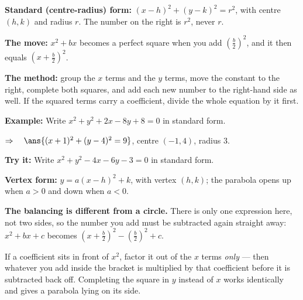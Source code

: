 \documentclass[12pt]{article}
\begin{document}


\begin{formulabox}
\textbf{Standard (centre-radius) form:} $(x-h)^2 + (y-k)^2 = r^2$, with centre $(h,k)$ and
radius $r$. The number on the right is $r^2$, never $r$.\par
\smallskip
\textbf{The move:} $x^2 + bx$ becomes a perfect square when you add $\left(\frac{b}{2}\right)^2$,
and it then equals $\left(x + \frac{b}{2}\right)^2$.\par
\smallskip
\textbf{The method:} group the $x$ terms and the $y$ terms, move the constant to the right,
complete both squares, and add each new number to the right-hand side as well. If the squared
terms carry a coefficient, divide the whole equation by it first.
\end{formulabox}

\begin{examplebox}
\textbf{Example:} \quad Write $x^2 + y^2 + 2x - 8y + 8 = 0$ in standard form.

$\Rightarrow\quad \ans{(x+1)^2 + (y-4)^2 = 9}$, \quad centre $(-1, 4)$, radius $3$.
\end{examplebox}

\begin{tryitbox}
\textbf{Try it:} \quad Write $x^2 + y^2 - 4x - 6y - 3 = 0$ in standard form.\\[2pt]
\end{tryitbox}


\begin{formulabox}
\textbf{Vertex form:} $y = a(x-h)^2 + k$, with vertex $(h,k)$; the parabola opens up when
$a > 0$ and down when $a < 0$.\par
\smallskip
\textbf{The balancing is different from a circle.} There is only one expression here, not two
sides, so the number you add must be subtracted again straight away: $x^2 + bx + c$ becomes
$\left(x + \frac{b}{2}\right)^2 - \left(\frac{b}{2}\right)^2 + c$.\par
\smallskip
If a coefficient sits in front of $x^2$, factor it out of the $x$ terms \emph{only} --- then
whatever you add inside the bracket is multiplied by that coefficient before it is subtracted
back off. Completing the square in $y$ instead of $x$ works identically and gives a parabola
lying on its side.
\end{formulabox}
\end{document}

